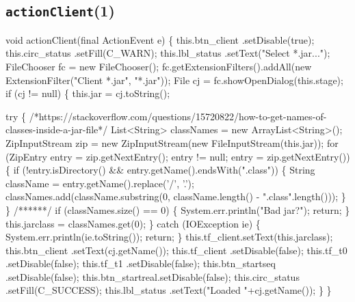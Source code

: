 \subsection{\texttt{actionClient}(1)}
\nwenddocs{}\endmoddef{}
void actionClient(final ActionEvent e) \{
  this.btn_client   .setDisable(true);
  this.circ_status  .setFill(C_WARN);
  this.lbl_status   .setText("Select *.jar...");
  FileChooser fc = new FileChooser();
  fc.getExtensionFilters().addAll(new ExtensionFilter("Client *.jar", "*.jar"));
  File cj = fc.showOpenDialog(this.stage);
  if (cj != null) \{
    this.jar = cj.toString();

    try \{
/*https://stackoverflow.com/questions/15720822/how-to-get-names-of-classes-inside-a-jar-file*/
List<String> classNames = new ArrayList<String>();
ZipInputStream zip = new ZipInputStream(new FileInputStream(this.jar));
for (ZipEntry entry = zip.getNextEntry(); entry != null; entry = zip.getNextEntry()) \{
  if (!entry.isDirectory() && entry.getName().endsWith(".class")) \{
    String className = entry.getName().replace('/', '.');
    classNames.add(className.substring(0, className.length() - ".class".length()));
  \}
\}
/******/
      if (classNames.size() == 0) \{
        System.err.println("Bad jar?");
        return;
      \}
      this.jarclass = classNames.get(0);
    \} catch (IOException ie) \{
      System.err.println(ie.toString());
      return;
    \}
    this.tf_client.setText(this.jarclass);
    this.btn_client   .setText(cj.getName());
    this.tf_client     .setDisable(false);
    this.tf_t0        .setDisable(false);
    this.tf_t1        .setDisable(false);
    this.btn_startseq .setDisable(false);
    this.btn_startreal.setDisable(false);
    this.circ_status  .setFill(C_SUCCESS);
    this.lbl_status   .setText("Loaded "+cj.getName());
  \}
\}
\nwendcode{}\nwdocspar

